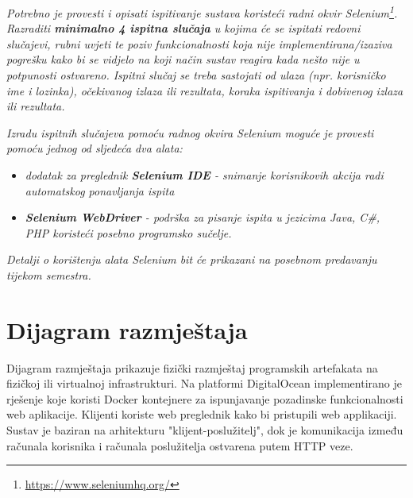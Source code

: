 			 \textit{Potrebno je provesti i opisati ispitivanje sustava koristeći radni okvir Selenium\footnote{\url{https://www.seleniumhq.org/}}. Razraditi \textbf{minimalno 4 ispitna slučaja} u kojima će se ispitati redovni slučajevi, rubni uvjeti te poziv funkcionalnosti koja nije implementirana/izaziva pogrešku kako bi se vidjelo na koji način sustav reagira kada nešto nije u potpunosti ostvareno. Ispitni slučaj se treba sastojati od ulaza (npr. korisničko ime i lozinka), očekivanog izlaza ili rezultata, koraka ispitivanja i dobivenog izlaza ili rezultata.\\ }
			 
			 \textit{Izradu ispitnih slučajeva pomoću radnog okvira Selenium moguće je provesti pomoću jednog od sljedeća dva alata:}
			 \begin{itemize}
			 	\item \textit{dodatak za preglednik \textbf{Selenium IDE} - snimanje korisnikovih akcija radi automatskog ponavljanja ispita	}
			 	\item \textit{\textbf{Selenium WebDriver} - podrška za pisanje ispita u jezicima Java, C\#, PHP koristeći posebno programsko sučelje.}
			 \end{itemize}
		 	\textit{Detalji o korištenju alata Selenium bit će prikazani na posebnom predavanju tijekom semestra.}
			
			\eject 
		
		
		\section{Dijagram razmještaja}

			 \noindent Dijagram razmještaja prikazuje fizički razmještaj programskih artefakata 
			 na fizičkoj ili virtualnoj infrastrukturi. Na platformi DigitalOcean implementirano je
			 rješenje koje koristi Docker kontejnere za ispunjavanje pozadinske funkcionalnosti 
			 web aplikacije. Klijenti koriste web preglednik kako bi pristupili web applikaciji.
			 Sustav je baziran na arhitekturu "klijent-poslužitelj", dok je komunikacija između 
			 računala korisnika i računala poslužitelja ostvarena putem HTTP veze.
			

